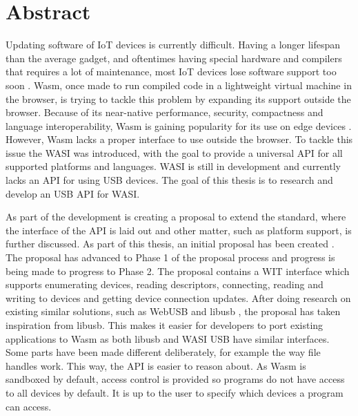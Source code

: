 \chapter*{Abstract}

Updating software of \acrfull{IoT} devices is currently difficult. Having a longer lifespan than the average gadget, and oftentimes having special hardware and compilers that requires a lot of maintenance, most \acrshort{IoT} devices lose software support too soon \cite{wasi_iot}.
\acrfull{Wasm}, once made to run compiled code in a lightweight virtual machine in the browser, is trying to tackle this problem by expanding its support outside the browser. Because of its near-native performance, security, compactness and language interoperability, \acrshort{Wasm} is gaining popularity for its use on edge devices \cite{wasi_iot}. However, \acrshort{Wasm} lacks a proper interface to use outside the browser. To tackle this issue the \acrfull{WASI} was introduced, with the goal to provide a universal \acrshort{API} for all supported platforms and languages. \acrshort{WASI} is still in development and currently lacks an \acrshort{API} for using USB devices. The goal of this thesis is to research and develop an \acrshort{USB} \acrshort{API} for \acrshort{WASI}.

As part of the development is creating a proposal to extend the standard, where the interface of the \acrshort{API} is laid out and other matter, such as platform support, is further discussed. As part of this thesis, an initial proposal has been created \cite{wasi_usb}. The proposal has advanced to Phase 1 of the proposal process \cite{proposal_phases} and progress is being made to progress to Phase 2. The proposal contains a \acrshort{WIT} interface which supports enumerating devices, reading descriptors, connecting, reading and writing to devices and getting device connection updates. After doing research on existing similar solutions, such as WebUSB \cite{WebUSB} and libusb \cite{LibUSB}, the proposal has taken inspiration from libusb. This makes it easier for developers to port existing applications to \acrshort{Wasm} as both libusb and \acrshort{WASI} \acrshort{USB} have similar interfaces. Some parts have been made different deliberately, for example the way file handles work. This way, the \acrshort{API} is easier to reason about. As \acrshort{Wasm} is sandboxed by default, access control is provided so programs do not have access to all devices by default. It is up to the user to specify which devices a program can access.

